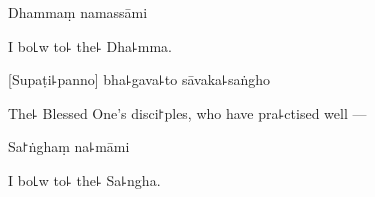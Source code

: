 Dhammaṃ namassāmi

\begin{english}
  I bo꜖w to꜕ the꜕ Dha꜕mma.
\end{english}


[Supaṭi꜕panno] bha꜕gava꜕to sāvaka꜕saṅgho

\begin{english}
  The꜕ Blessed One's disci꜓ples, who have pra꜕ctised well ---
\end{english}

Sa꜓ṅghaṃ na꜕māmi

\begin{english}
  I bo꜖w to꜕ the꜕ Sa꜕ngha.
\end{english}


